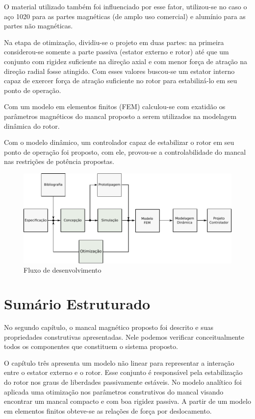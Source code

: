 O material utilizado também foi influenciado por esse fator, utilizou-se no caso o aço 1020 para as partes magnéticas (de amplo uso comercial) e alumínio para as partes não magnéticas. 

Na etapa de otimização, dividiu-se o projeto em duas partes: na primeira considerou-se somente a parte passiva (estator externo e rotor) até que um conjunto com rigidez suficiente na direção axial e com menor força de atração na direção radial fosse atingido. Com esses valores buscou-se um estator interno capaz de exercer força de atração suficiente no rotor para estabilizá-lo em seu ponto de operação.

Com um modelo em elementos finitos (FEM) calculou-se com exatidão os parâmetros magnéticos do mancal proposto a serem utilizados na modelagem dinâmica do rotor.

Com o modelo dinâmico, um controlador capaz de estabilizar o rotor em seu ponto de operação foi proposto, com ele, provou-se a controlabilidade do mancal nas restrições de potência propostas. 


 
\begin{figure}[th!]
	\centering
	\includegraphics[width=1\linewidth]{Figs/metodologia_fluxo_dev}
	\caption{Fluxo de desenvolvimento}
	\label{fig:metodologia:fluxo:dev}
\end{figure} 
 
\section{Sumário Estruturado}
 
No segundo capítulo, o mancal magnético proposto foi descrito e suas propriedades construtivas apresentadas. Nele podemos verificar conceitualmente todos os componentes que constituem o sistema proposto.

O capítulo três apresenta um modelo não linear para representar a interação entre o estator externo e o rotor. Esse conjunto é responsável pela estabilização do rotor nos graus de liberdades passivamente estáveis. No modelo analítico foi aplicada uma otimização nos parâmetros construtivos do mancal visando encontrar um mancal compacto e com boa rigidez passiva. A partir de um modelo em elementos finitos obteve-se as relações de força por deslocamento.

